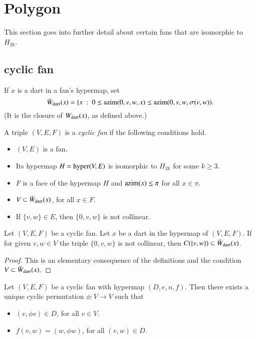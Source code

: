 \section{Polygon}

This section goes into further detail about certain fans that are isomorphic to $H_{2k}$.

\subsection{cyclic fan}

If $x$ is a dart in a fan's hypermap, set
$$
\bar W_{\text{dart}}(x) = \{ x\ :\  0\le {\operatorname{azim}}(0,v,w,x)\le {\operatorname{azim}}(0,v,w,\sigma(v,w)).
$$
(It is the closure of $W_{\text{dart}}(x)$, as defined above.)

\begin{definition}  A triple $(V,E,F)$ is a {\it cyclic fan} if the following conditions hold.
\begin{itemize} 
\item $(V,E)$ is a fan.
\item Its hypermap $H={\operatorname{hyper}}(V,E)$ is isomorphic to $H_{2k}$ for some $k\ge 3$.
\item $F$ is a face of the hypermap $H$ and ${\operatorname{azim}}(x)\le \pi$ for all $x\in \pi$.
\item $V\subset \bar W_{\text{dart}}(x)$, for all $x\in F$.
\item If $\{v,w\}\in E$, then $\{0,v,w\}$ is not collinear.
\end{itemize}
\end{definition}

\begin{lemma}  Let $(V,E,F)$ be a cyclic fan.  Let $x$ be a dart in the hypermap of $(V,E,F)$.  If for given $v,w\in V$  the triple $\{0,v,w\}$ is not collinear, then $C(\{v,w\}) \subset \bar W_{\text{dart}}(x)$.
\end{lemma}

\begin{proof}  This is an elementary consequence of the definitions and the condition $V\subset \bar W_{\text{dart}}(x)$.
\end{proof}

\begin{lemma}  Let $(V,E,F)$ be a cyclic fan with hypermap $(D,e,n,f)$.  Then there exists a unique cyclic permutation $\phi:V\to V$ such that
\begin{itemize}
\item $(v,\phi v)\in D$, for all $v\in V$.
\item $f(v,w) = (w,\phi w)$, for all $(v,w)\in D$.
\end{itemize}
\end{lemma}

